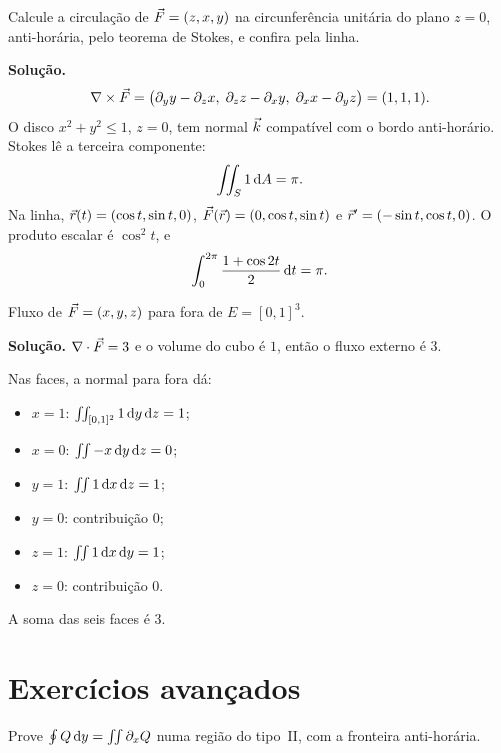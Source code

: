 \documentclass[11pt,a4paper]{article}
\begin{document}
\begin{exercicio}
Calcule a circulação de $\vec{F}=(z,x,y)$ na circunferência unitária do plano $z=0$, anti-horária, pelo teorema de Stokes, e confira pela linha.
\end{exercicio}

\noindent\textbf{Solução.}
\[
\nabla\times\vec{F}
=\bigl(\partial_y y-\partial_z x,\;\partial_z z-\partial_x y,\;\partial_x x-\partial_y z\bigr)
=(1,1,1).
\]
O disco $x^2+y^2\le 1$, $z=0$, tem normal $\vec{k}$ compatível com o bordo anti-horário. Stokes lê a terceira componente:
\[
\iint_S 1\,\mathrm{d} A=\pi.
\]
Na linha, $\vec{r}(t)=(\cos t,\sin t,0)$, $\vec{F}(\vec{r})=(0,\cos t,\sin t)$ e $\vec{r}'=(-\sin t,\cos t,0)$. O produto escalar é $\cos^2 t$, e
\[
\int_0^{2\pi}\frac{1+\cos 2t}{2}\,\mathrm{d} t=\pi.
\]

\begin{exercicio}
Fluxo de $\vec{F}=(x,y,z)$ para fora de $E=[0,1]^3$.
\end{exercicio}

\noindent\textbf{Solução.}
$\nabla\cdot\vec{F}=3$ e o volume do cubo é $1$, então o fluxo externo é $3$.

Nas faces, a normal para fora dá:
\begin{itemize}
\item $x=1$: $\iint_{[0,1]^2} 1\,\mathrm{d} y\,\mathrm{d} z=1$;
\item $x=0$: $\iint -x\,\mathrm{d} y\,\mathrm{d} z=0$;
\item $y=1$: $\iint 1\,\mathrm{d} x\,\mathrm{d} z=1$;
\item $y=0$: contribuição $0$;
\item $z=1$: $\iint 1\,\mathrm{d} x\,\mathrm{d} y=1$;
\item $z=0$: contribuição $0$.
\end{itemize}
A soma das seis faces é $3$.

\section{Exercícios avançados}

\begin{exercicio}
Prove $\oint Q\,\mathrm{d} y=\iint\partial_x Q$ numa região do tipo~II, com a fronteira anti-horária.
\end{exercicio}
\end{document}
